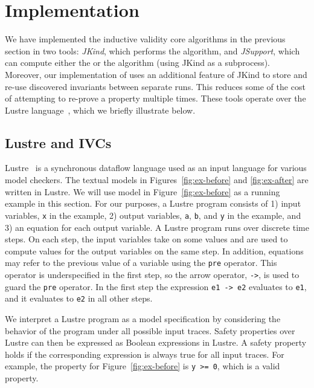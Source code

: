 \section{Implementation}
\label{sec:impl}

We have implemented the inductive validity core algorithms in the
previous section in two tools: {\em JKind}, which performs the \ucalg
algorithm, and {\em JSupport}, which can compute either the \bfalg or
the \ucbfalg algorithm (using JKind as a subprocess). Moreover, our
implementation of \ucbfalg uses an additional feature of JKind to
store and re-use discovered invariants between separate runs. This
reduces some of the cost of attempting to re-prove a property multiple
times. These tools operate over the Lustre
language~\cite{Halbwachs91:lustre}, which we briefly illustrate below.

\subsection{Lustre and IVCs}

Lustre~\cite{Halbwachs91:lustre} is a synchronous dataflow language
used as an input language for various model checkers. The textual
models in Figures~\ref{fig:ex-before} and \ref{fig:ex-after} are
written in Lustre. We will use model in Figure~\ref{fig:ex-before} as
a running example in this section. For our purposes, a Lustre program
consists of 1) input variables, {\tt x} in the example, 2) output
variables, {\tt a}, {\tt b}, and {\tt y} in the example, and 3) an
equation for each output variable. A Lustre program runs over discrete
time steps. On each step, the input variables take on some values and
are used to compute values for the output variables on the same step.
In addition, equations may refer to the previous value of a variable
using the {\tt pre} operator. This operator is underspecified in the
first step, so the arrow operator, {\tt ->}, is used to guard the
{\tt pre} operator. In the first step the expression {\tt e1 -> e2}
evaluates to {\tt e1}, and it evaluates to {\tt e2} in all other steps.

We interpret a Lustre program as a model specification by considering
the behavior of the program under all possible input traces. Safety
properties over Lustre can then be expressed as Boolean expressions in
Lustre. A safety property holds if the corresponding expression is
always true for all input traces. For example, the property for
Figure~\ref{fig:ex-before} is {\tt y >= 0}, which is a valid property.

